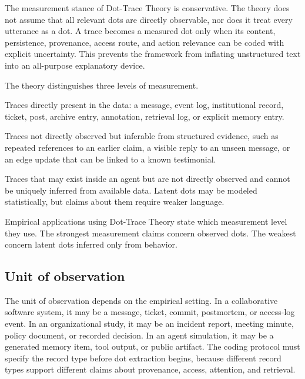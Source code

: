 \documentclass[11pt]{article}
\theoremstyle{remark}
\begin{document}
The measurement stance of Dot-Trace Theory is conservative. The theory does not assume that all relevant dots are directly observable, nor does it treat every utterance as a dot. A trace becomes a measured dot only when its content, persistence, provenance, access route, and action relevance can be coded with explicit uncertainty. This prevents the framework from inflating unstructured text into an all-purpose explanatory device.


The theory distinguishes three levels of measurement.

\begin{description}[leftmargin=3.2cm,style=nextline]
\item[Observed dots]
Traces directly present in the data: a message, event log, institutional
record, ticket, post, archive entry, annotation, retrieval log, or
explicit memory entry.

\item[Inferred dots]
Traces not directly observed but inferable from structured evidence, such
as repeated references to an earlier claim, a visible reply to an unseen
message, or an edge update that can be linked to a known testimonial.

\item[Latent dots]
Traces that may exist inside an agent but are not directly observed and
cannot be uniquely inferred from available data. Latent dots may be
modeled statistically, but claims about them require weaker language.
\end{description}

Empirical applications using Dot-Trace Theory state which measurement level they use. The strongest measurement claims concern observed dots. The weakest
concern latent dots inferred only from behavior.

\subsection{Unit of observation}\label{unit-of-observation}

The unit of observation depends on the empirical setting. In a collaborative software system, it may be a message, ticket, commit, postmortem, or access-log event. In an organizational study, it may be an incident report, meeting minute, policy document, or recorded decision. In an agent simulation, it may be a generated memory item, tool output, or public artifact. The coding protocol must specify the record type before dot extraction begins, because different record types support different claims about provenance, access, attention, and retrieval.
\end{document}
